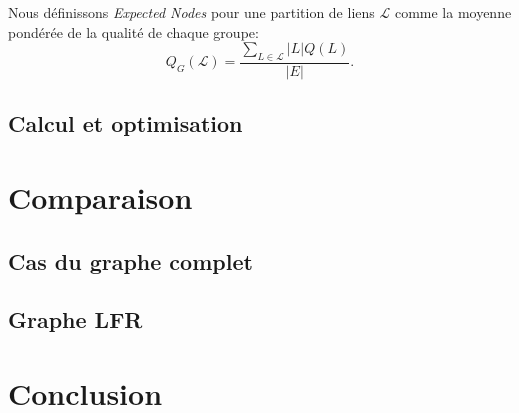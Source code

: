 Nous définissons \emph{Expected Nodes} pour une partition de liens $\mathcal{L}$ comme la moyenne pondérée de la qualité de chaque groupe:
\begin{equation}
\label{eq:qualite_globale} Q_G(\mathcal{L}) = \dfrac{\sum_{L\in \mathcal{L}} |L|Q(L)}{|E|}.
\end{equation}

\subsection{Calcul et optimisation}


\section{Comparaison}
\subsection{Cas du graphe complet}


\subsection{Graphe LFR}


\section{Conclusion}
